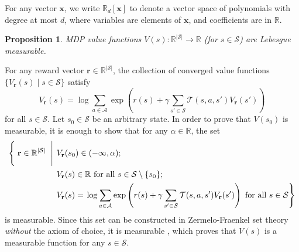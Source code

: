 \documentclass{article}
\newtheorem{proposition}[theorem]{Proposition}
\newenvironment{proofsketch}{%
  \renewcommand{\proofname}{Proof sketch}\proof}{\endproof}
\theoremstyle{definition}
\theoremstyle{remark}
\begin{document}
For any vector $\mathbf{x}$, we write $\mathbb{R}_d[\mathbf{x}]$ to denote a
vector space of polynomials with degree at most $d$, where variables are
elements of $\mathbf{x}$, and coefficients are in $\mathbb{R}$.

\begin{proposition} \label{thm:measurability}
  MDP value functions $V(s) : \mathbb{R}^{|\mathcal{S}|} \to \mathbb{R}$ (for $s
  \in \mathcal{S}$) are Lebesgue measurable.
\end{proposition}
\begin{proofsketch}
  For any reward vector $\mathbf{r} \in \mathbb{R}^{|\mathcal{S}|}$, the
  collection of converged value functions $\{ V_{\mathbf{r}}(s) \mid s \in
  \mathcal{S} \}$ satisfy
  \[
    V_{\mathbf{r}}(s) = \log \sum_{a \in \mathcal{A}}
    \exp\left( r(s) + \gamma\sum_{s' \in \mathcal{S}} \mathcal{T}(s, a,
      s')V_{\mathbf{r}}(s') \right)
  \]
  for all $s \in \mathcal{S}$. Let $s_0 \in \mathcal{S}$ be an arbitrary state.
  In order to prove that $V(s_0)$ is measurable, it is enough to show that for
  any $\alpha \in \mathbb{R}$, the set
  \[
    \begin{split}
      \left\{ \vphantom{\sum_{a \in \mathcal{A}}} \right. \mathbf{r} \in
      \mathbb{R}^{|\mathcal{S}|} \left. \vphantom{\sum_{a \in \mathcal{A}}} \;
        \middle| \; \right. &V_{\mathbf{r}}(s_0) \in (-\infty, \alpha); \\
      &V_{\mathbf{r}}(s) \in
      \mathbb{R} \text{ for all } s \in \mathcal{S} \setminus \{ s_0 \}; \\
      &V_{\mathbf{r}}(s) = \left. \log \sum_{a \in \mathcal{A}} \exp\left( r(s)
          + \gamma\sum_{s' \in \mathcal{S}} \mathcal{T}(s, a,
          s')V_{\mathbf{r}}(s') \right) \text{ for all } s \in
        \mathcal{S}\right\}
    \end{split}
  \]
  is measurable. Since this set can be constructed in Zermelo-Fraenkel set
  theory \emph{without} the axiom of choice, it is measurable
  \cite{herrlich2006axiom}, which proves that $V(s)$ is a measurable function
  for any $s \in \mathcal{S}$.
\end{proofsketch}
\end{document}
